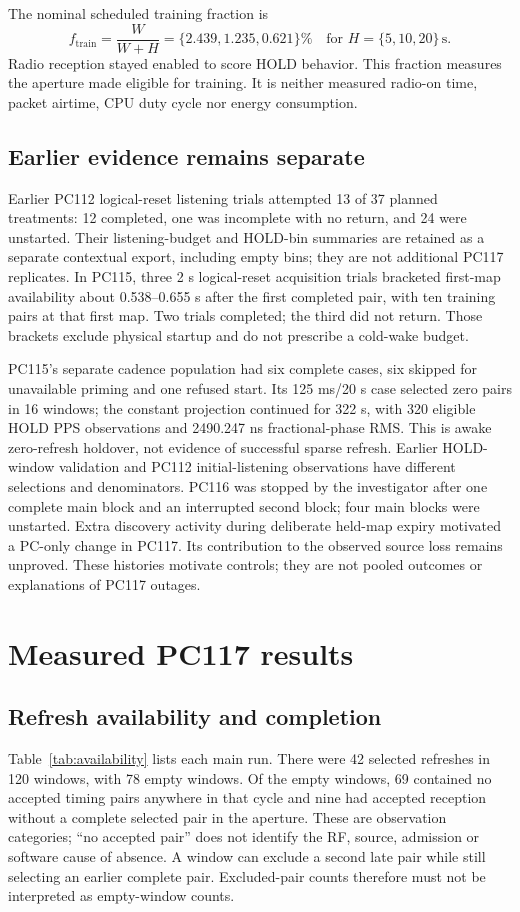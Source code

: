 \documentclass[11pt,letterpaper]{article}
\begin{document}
The nominal scheduled training fraction is
\begin{equation}
 f_{\mathrm{train}}=\frac{W}{W+H}
 =\{2.439,1.235,0.621\}\%\quad\text{for }H=\{5,10,20\}\,\mathrm{s}.\label{eq:fraction}
\end{equation}
Radio reception stayed enabled to score HOLD behavior. This fraction measures the aperture made eligible for training. It is neither measured radio-on time, packet airtime, CPU duty cycle nor energy consumption.

\subsection{Earlier evidence remains separate}
Earlier PC112 logical-reset listening trials attempted 13 of 37 planned treatments: 12 completed, one was incomplete with no return, and 24 were unstarted. Their listening-budget and HOLD-bin summaries are retained as a separate contextual export, including empty bins; they are not additional PC117 replicates. In PC115, three 2 s logical-reset acquisition trials bracketed first-map availability about 0.538--0.655 s after the first completed pair, with ten training pairs at that first map. Two trials completed; the third did not return. Those brackets exclude physical startup and do not prescribe a cold-wake budget.

PC115's separate cadence population had six complete cases, six skipped for unavailable priming and one refused start. Its 125 ms/20 s case selected zero pairs in 16 windows; the constant projection continued for 322 s, with 320 eligible HOLD PPS observations and 2490.247 ns fractional-phase RMS. This is awake zero-refresh holdover, not evidence of successful sparse refresh. Earlier HOLD-window validation and PC112 initial-listening observations have different selections and denominators. PC116 was stopped by the investigator after one complete main block and an interrupted second block; four main blocks were unstarted. Extra discovery activity during deliberate held-map expiry motivated a PC-only change in PC117. Its contribution to the observed source loss remains unproved. These histories motivate controls; they are not pooled outcomes or explanations of PC117 outages.

\section{Measured PC117 results}\label{sec:results}
\subsection{Refresh availability and completion}
Table~\ref{tab:availability} lists each main run. There were 42 selected refreshes in 120 windows, with 78 empty windows. Of the empty windows, 69 contained no accepted timing pairs anywhere in that cycle and nine had accepted reception without a complete selected pair in the aperture. These are observation categories; ``no accepted pair'' does not identify the RF, source, admission or software cause of absence. A window can exclude a second late pair while still selecting an earlier complete pair. Excluded-pair counts therefore must not be interpreted as empty-window counts.
\end{document}
